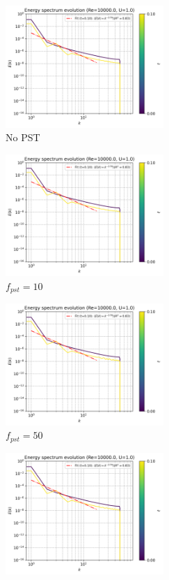 \begin{figure}[H]
  \begin{subfigure}{7cm}
    \centering\includegraphics[width=6cm]{Code-Figures/keps/pst/c0_20_tait_pec_dtmul_1_nx_100_pst_-1_re_10000_k_eps/energy_spectrum_evolution.png}
    \caption{No PST}
  \end{subfigure}
  \begin{subfigure}{7cm}
    \centering\includegraphics[width=6cm]{Code-Figures/keps/pst/c0_20_tait_pec_dtmul_1_nx_100_pst_10_re_10000_k_eps/energy_spectrum_evolution.png}
    \caption{$f_{pst} = 10$}
  \end{subfigure}
  \begin{subfigure}{7cm}
    \centering\includegraphics[width=6cm]{Code-Figures/keps/pst/c0_20_tait_pec_dtmul_1_nx_100_pst_50_re_10000_k_eps/energy_spectrum_evolution.png}
    \caption{$f_{pst} = 50$}
  \end{subfigure}
  \begin{subfigure}{7cm}
    \centering\includegraphics[width=6cm]{Code-Figures/keps/pst/c0_20_tait_pec_dtmul_1_nx_100_pst_100_re_10000_k_eps/energy_spectrum_evolution.png}

\end{subfigure}
\end{figure}
